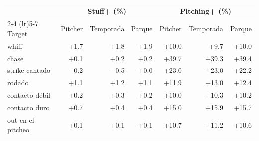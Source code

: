 \begin{tabular}{lrrrrrr}
\toprule
 & \multicolumn{3}{c}{Stuff+ (\%)} & \multicolumn{3}{c}{Pitching+ (\%)} \\
\cmidrule(lr){2-4} \cmidrule(lr){5-7}
Target & Pitcher & Temporada & Parque & Pitcher & Temporada & Parque \\
\midrule
whiff & +1.7 & +1.8 & +1.9 & +10.0 & +9.7 & +10.0 \\
chase & +0.1 & +0.2 & +0.2 & +39.7 & +39.3 & +39.4 \\
strike cantado & \ensuremath{-}0.2 & \ensuremath{-}0.5 & +0.0 & +23.0 & +23.0 & +22.2 \\
rodado & +1.1 & +1.2 & +1.1 & +11.9 & +13.0 & +12.4 \\
contacto débil & +0.2 & +0.3 & +0.2 & +10.0 & +10.3 & +10.2 \\
contacto duro & +0.7 & +0.4 & +0.4 & +15.0 & +15.9 & +15.7 \\
out en el pitcheo & +0.1 & +0.1 & +0.1 & +10.7 & +11.2 & +10.6 \\
\bottomrule
\end{tabular}
